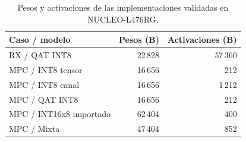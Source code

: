 \begin{table}[H]
\centering\small
\caption{Pesos y activaciones de las implementaciones validadas en NUCLEO-L476RG.}\label{tab:nucleo_memoria}
\begin{tabularx}{\linewidth}{Yrr}\toprule
Caso / modelo & Pesos (B) & Activaciones (B)\\\midrule
RX / QAT INT8 & 22\,828 & 57\,360\\
MPC / INT8 tensor & 16\,656 & 212\\
MPC / INT8 canal & 16\,656 & 1\,212\\
MPC / QAT INT8 & 16\,656 & 212\\
MPC / INT16x8 importado & 62\,404 & 400\\
MPC / Mixta & 47\,404 & 852\\
\bottomrule\end{tabularx}
\end{table}
